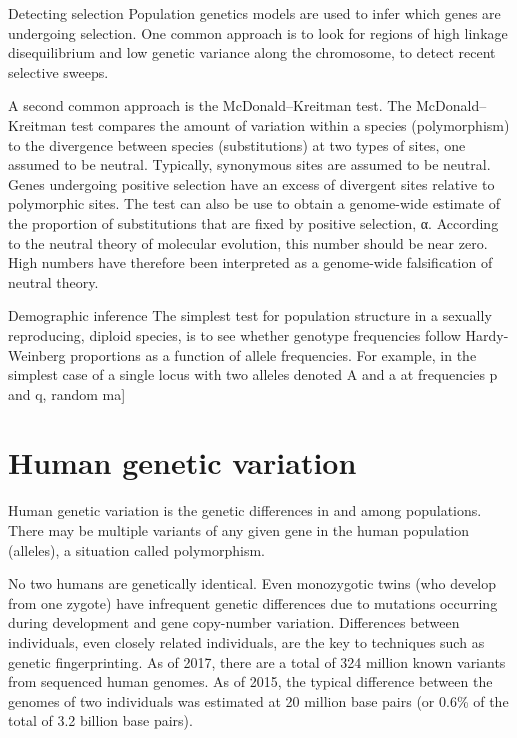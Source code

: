 Detecting selection
Population genetics models are used to infer which genes are undergoing selection. One common approach is to look for regions of high linkage disequilibrium and low genetic variance along the chromosome, to detect recent selective sweeps.

A second common approach is the McDonald--Kreitman test. The McDonald--Kreitman test compares the amount of variation within a species (polymorphism) to the divergence between species (substitutions) at two types of sites, one assumed to be neutral. Typically, synonymous sites are assumed to be neutral. Genes undergoing positive selection have an excess of divergent sites relative to polymorphic sites. The test can also be use to obtain a genome-wide estimate of the proportion of substitutions that are fixed by positive selection, α. According to the neutral theory of molecular evolution, this number should be near zero. High numbers have therefore been interpreted as a genome-wide falsification of neutral theory.

Demographic inference
The simplest test for population structure in a sexually reproducing, diploid species, is to see whether genotype frequencies follow Hardy-Weinberg proportions as a function of allele frequencies. For example, in the simplest case of a single locus with two alleles denoted A and a at frequencies p and q, random ma{]}

\hypertarget{human-genetic-variation}{%
\section{Human genetic variation}\label{human-genetic-variation}}

Human genetic variation is the genetic differences in and among populations. There may be multiple variants of any given gene in the human population (alleles), a situation called polymorphism.

No two humans are genetically identical. Even monozygotic twins (who develop from one zygote) have infrequent genetic differences due to mutations occurring during development and gene copy-number variation. Differences between individuals, even closely related individuals, are the key to techniques such as genetic fingerprinting. As of 2017, there are a total of 324 million known variants from sequenced human genomes. As of 2015, the typical difference between the genomes of two individuals was estimated at 20 million base pairs (or 0.6\% of the total of 3.2 billion base pairs).

